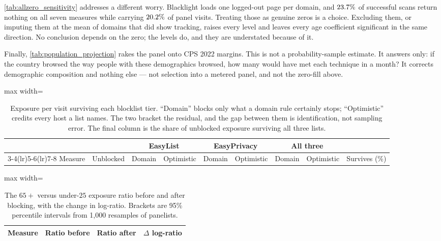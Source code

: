 \documentclass[12pt, letterpaper]{article}
\begin{document}
\cref{tab:allzero_sensitivity} addresses a different worry. Blacklight loads one
logged-out page per domain, and $23.7\%$ of successful scans return nothing on
all seven measures while carrying $20.2\%$ of panel visits. Treating those as
genuine zeros is a choice. Excluding them, or imputing them at the mean of
domains that did show tracking, raises every level and leaves every age
coefficient significant in the same direction. No conclusion depends on the
zero; the levels do, and they are understated because of it.

Finally, \cref{tab:population_projection} rakes the panel onto CPS 2022 margins.
This is not a probability-sample estimate. It answers only: if the country
browsed the way people with these demographics browsed, how many would have met
each technique in a month? It corrects demographic composition and nothing else
--- not selection into a metered panel, and not the zero-fill above.

\begin{table}[ht]
\centering
\caption{Exposure per visit surviving each blocklist tier. ``Domain'' blocks only what a domain rule certainly stops; ``Optimistic'' credits every host a list names. The two bracket the residual, and the gap between them is identification, not sampling error. The final column is the share of unblocked exposure surviving all three lists.}
\label{tab:residual_levels}
\begin{adjustbox}{max width=\textwidth}
\begin{tabular}{lrrrrrrrr}
\toprule
& & \multicolumn{2}{c}{EasyList} & \multicolumn{2}{c}{EasyPrivacy}
& \multicolumn{2}{c}{All three} & \\
\cmidrule(lr){3-4}\cmidrule(lr){5-6}\cmidrule(lr){7-8}
Measure & Unblocked & Domain & Optimistic & Domain & Optimistic & Domain
& Optimistic & Survives (\%) \\
\midrule

\bottomrule
\end{tabular}
\end{adjustbox}
\end{table}

\begin{table}[ht]
\centering
\caption{The $65+$ versus under-$25$ exposure ratio before and after blocking, with the change in log-ratio. Brackets are 95\% percentile intervals from 1{,}000 resamples of panelists.}
\label{tab:residual_age_gap}
\begin{adjustbox}{max width=\textwidth}
\begin{tabular}{lrrr}
\toprule
Measure & Ratio before & Ratio after & $\Delta$ log-ratio \\
\midrule

\bottomrule
\end{tabular}
\end{adjustbox}
\end{table}
\end{document}
